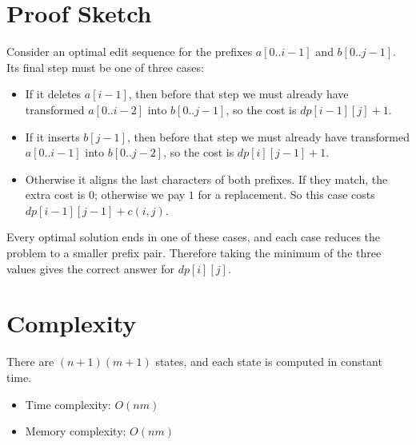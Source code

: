 \begin{animation}[id="edit-distance-dp", label="Edit Distance DP walkthrough"]
\step
{}
\end{animation}

\section{Proof Sketch}

Consider an optimal edit sequence for the prefixes $a[0..i-1]$ and $b[0..j-1]$.
Its final step must be one of three cases:

\begin{itemize}
\item If it deletes $a[i-1]$, then before that step we must already have
transformed $a[0..i-2]$ into $b[0..j-1]$, so the cost is $dp[i-1][j] + 1$.
\item If it inserts $b[j-1]$, then before that step we must already have
transformed $a[0..i-1]$ into $b[0..j-2]$, so the cost is $dp[i][j-1] + 1$.
\item Otherwise it aligns the last characters of both prefixes. If they match,
the extra cost is $0$; otherwise we pay $1$ for a replacement. So this case
costs $dp[i-1][j-1] + c(i,j)$.
\end{itemize}

Every optimal solution ends in one of these cases, and each case reduces the
problem to a smaller prefix pair. Therefore taking the minimum of the three
values gives the correct answer for $dp[i][j]$.

\section{Complexity}

There are $(n+1)(m+1)$ states, and each state is computed in constant time.

\begin{itemize}
\item Time complexity: $O(nm)$
\item Memory complexity: $O(nm)$
\end{itemize}

